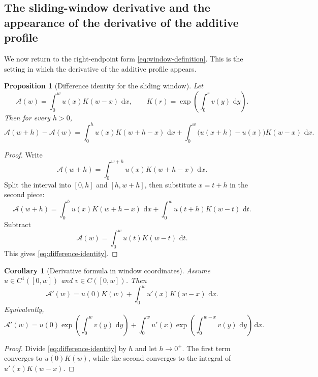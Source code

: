 \documentclass[11pt]{article}
\newtheorem{proposition}{Proposition}
\newtheorem{corollary}{Corollary}
\newcommand{\dd}{\,\mathrm{d}}
\begin{document}
\subsection{The sliding-window derivative and the appearance of the derivative of the additive profile}

We now return to the right-endpoint form \eqref{eq:window-definition}. This is the setting in which the derivative of the additive profile appears.

\begin{proposition}[Difference identity for the sliding window]
\label{prop:difference-identity}
Let
\[
\mathcal{A}(w)=\int_0^w u(x)K(w-x)\,\dd x,
\qquad
K(r)=\exp\!\left(\int_0^r v(y)\,\dd y\right).
\]
Then for every $h>0$,
\begin{equation}
\label{eq:difference-identity}
\mathcal{A}(w+h)-\mathcal{A}(w)
=
\int_0^h u(x)K(w+h-x)\,\dd x
+
\int_0^w \bigl(u(x+h)-u(x)\bigr)K(w-x)\,\dd x.
\end{equation}
\end{proposition}

\begin{proof}
Write
\[
\mathcal{A}(w+h)=\int_0^{w+h}u(x)K(w+h-x)\,\dd x.
\]
Split the interval into $[0,h]$ and $[h,w+h]$, then substitute $x=t+h$ in the second piece:
\[
\mathcal{A}(w+h)
=
\int_0^h u(x)K(w+h-x)\,\dd x
+
\int_0^w u(t+h)K(w-t)\,\dd t.
\]
Subtract
\[
\mathcal{A}(w)=\int_0^w u(t)K(w-t)\,\dd t.
\]
This gives \eqref{eq:difference-identity}.
\end{proof}

\begin{corollary}[Derivative formula in window coordinates]
\label{cor:window-derivative}
Assume $u\in C^1([0,w])$ and $v\in C([0,w])$. Then
\begin{equation}
\label{eq:window-derivative}
\mathcal{A}'(w)
=
 u(0)K(w)+\int_0^w u'(x)K(w-x)\,\dd x.
\end{equation}
Equivalently,
\begin{equation}
\label{eq:window-derivative-expanded}
\mathcal{A}'(w)
=
 u(0)\exp\!\left(\int_0^w v(y)\,\dd y\right)
+
\int_0^w u'(x)\exp\!\left(\int_0^{w-x} v(y)\,\dd y\right)\dd x.
\end{equation}
\end{corollary}

\begin{proof}
Divide \eqref{eq:difference-identity} by $h$ and let $h\to0^+$. The first term converges to $u(0)K(w)$, while the second converges to the integral of $u'(x)K(w-x)$.
\end{proof}
\end{document}
